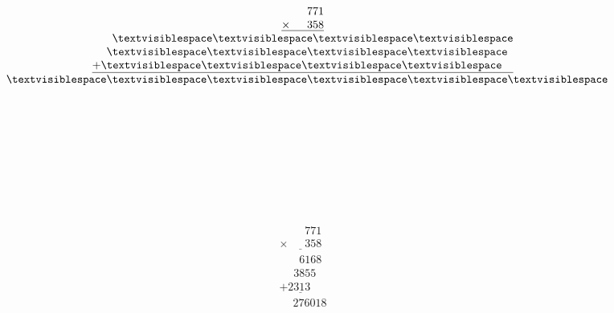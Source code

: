 \begin{minipage}[t]{0.3\linewidth}
\begin{align*}\begin{array}{c}
\phantom{
\times000
}
771\\
\underline{
\times
\phantom{
000
}
358
}\\
\phantom{
+00
}
\textvisiblespace
\textvisiblespace
\textvisiblespace
\textvisiblespace
\\
\phantom{
+0
}
\textvisiblespace
\textvisiblespace
\textvisiblespace
\textvisiblespace
\phantom0\\
\underline{
+
\textvisiblespace
\textvisiblespace
\textvisiblespace
\textvisiblespace
\phantom0\phantom0
}
\\
\phantom{+}
\textvisiblespace
\textvisiblespace
\textvisiblespace
\textvisiblespace
\textvisiblespace
\textvisiblespace
\end{array}\end{align*}
\end{minipage}
\begin{minipage}[t]{0.05\linewidth}
\begin{align*}\begin{array}{c}
\textvisiblespace
\\
\textvisiblespace
\\
\textvisiblespace
\\
\textvisiblespace
\\
\textvisiblespace
\\
\textvisiblespace
\end{array}\end{align*}
\end{minipage}
\begin{minipage}[t]{0.05\linewidth}
\begin{align*}\begin{array}{c}
\end{array}\end{align*}
\end{minipage}
\begin{minipage}[t]{0.3\linewidth}
\begin{align*}\begin{array}{c}
\phantom{
\times000
}
771\\
\underline{
\times
\phantom{
000
}
358
}\\
\phantom{
+00
}
6168
\\
\phantom{
+0
}
3855
\phantom0\\
\underline{
+
2313
\phantom0\phantom0
}
\\
\phantom{+}
276018
\end{array}\end{align*}
\end{minipage}
